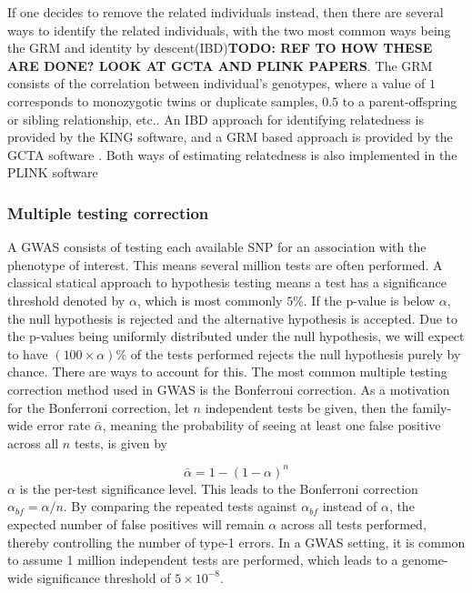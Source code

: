 If one decides to remove the related individuals instead, then there are several ways to identify the related individuals, with the two most common ways being the GRM and identity by descent(IBD)\textbf{TODO: REF TO HOW THESE ARE DONE? LOOK AT GCTA AND PLINK PAPERS}. The GRM consists of the correlation between individual's genotypes, where a value of $ 1 $ corresponds to monozygotic twins or duplicate samples, $ 0.5 $ to a parent-offspring or sibling relationship, etc.. %
An IBD approach for identifying relatedness is provided by the KING software\cite{manichaikul2010robust}, and a GRM based approach is provided by the GCTA software \cite{yang2011gcta}. Both ways of estimating relatedness is also implemented in the PLINK software\cite{chang2015second,purcell2007plink}


\subsubsection{Multiple testing correction}
A GWAS consists of testing each available SNP for an association with the phenotype of interest. This means several million tests are often performed. A classical statical approach to hypothesis testing means a test has a significance threshold denoted by $ \alpha $, which is most commonly $ 5\% $. If the p-value is below $ \alpha $, the null hypothesis is rejected and the alternative hypothesis is accepted. Due to the p-values being uniformly distributed under the null hypothesis, we will expect to have $ (100\times \alpha) \%$ of the tests performed rejects the null hypothesis purely by chance. There are ways to account for this. The most common multiple testing correction method used in GWAS is the Bonferroni correction\cite{balding2006tutorial,rice2008methods}. As a motivation for the Bonferroni correction, let $ n $ independent tests be given, then the family-wide error rate $ \bar{\alpha} $, meaning the probability of seeing at least one false positive across all $ n $ tests, is given by

\begin{equation} \label{eq:bonferroni}
\bar{\alpha} = 1 - (1-\alpha)^n 
\end{equation}
$ \alpha$ is the per-test significance level. This leads to the Bonferroni correction $ \alpha_{bf} =  \alpha/n $. By comparing the repeated tests against $ \alpha_{bf} $ instead of $ \alpha $, the expected number of false positives will remain $ \alpha $ across all tests performed, thereby controlling the number of type-1 errors. In a GWAS setting, it is common to assume 1 million independent tests are performed\cite{pe2008estimation}, which leads to a genome-wide significance threshold of $ 5 \times 10^{-8} $.



